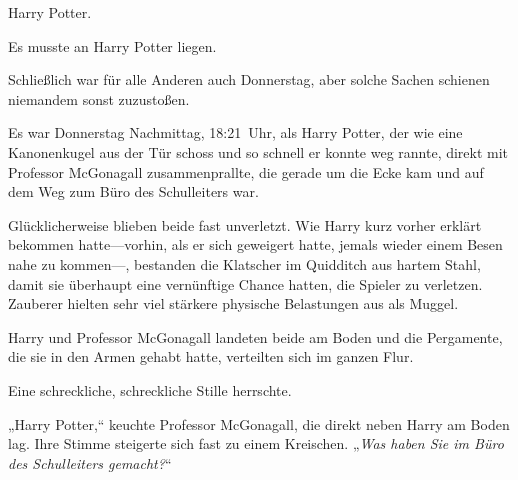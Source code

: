 \later

Harry Potter.

Es musste an Harry Potter liegen.

Schließlich war für alle Anderen auch Donnerstag, aber solche Sachen schienen niemandem sonst zuzustoßen.

Es war Donnerstag Nachmittag, 18:21~Uhr, als Harry Potter, der wie eine Kanonenkugel aus der Tür schoss und so schnell er konnte weg rannte, direkt mit Professor McGonagall zusammenprallte, die gerade um die Ecke kam und auf dem Weg zum Büro des Schulleiters war.

Glücklicherweise blieben beide fast unverletzt. Wie Harry kurz vorher erklärt bekommen hatte—vorhin, als er sich geweigert hatte, jemals wieder einem Besen nahe zu kommen—, bestanden die Klatscher im Quidditch aus hartem Stahl, damit sie überhaupt eine vernünftige Chance hatten, die Spieler zu verletzen. Zauberer hielten sehr viel stärkere physische Belastungen aus als Muggel.

Harry und Professor McGonagall landeten beide am Boden und die Pergamente, die sie in den Armen gehabt hatte, verteilten sich im ganzen Flur.

Eine schreckliche, schreckliche Stille herrschte.

„Harry Potter,“ keuchte Professor McGonagall, die direkt neben Harry am Boden lag. Ihre Stimme steigerte sich fast zu einem Kreischen. „\emph{Was haben Sie im Büro des Schulleiters gemacht?}“

